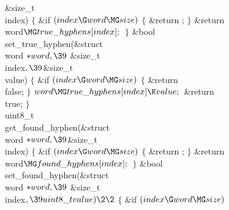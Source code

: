 \&{size\_t} \\{index})\2\2\6
${}\{{}$\1\6
\&{if} ${}(\\{index}\G\\{word}\MG\\{size}){}$\5
${}\{{}$\1\6
\&{return} ;\6
\4${}\}{}$\2\6
\&{return} \\{word}${}\MG\\{true\_hyphens}[\\{index}];{}$\6
\4${}\}{}$\2\7
\1\1\&{bool} \\{set\_true\_hyphen}(\&{struct} \\{word} ${}{*}\\{word},\39{}$%
\&{size\_t} \\{index}${},\39{}$\&{size\_t} \\{value})\2\2\6
${}\{{}$\1\6
\&{if} ${}(\\{index}\G\\{word}\MG\\{size}){}$\5
${}\{{}$\1\6
\&{return} \\{false};\6
\4${}\}{}$\2\6
${}\\{word}\MG\\{true\_hyphens}[\\{index}]\K\\{value};{}$\6
\&{return} \\{true};\6
\4${}\}{}$\2\7
\1\1\\{uint8\_t}\\{get\_found\_hyphen}(\&{struct} \\{word} ${}{*}\\{word},%
\39{}$\&{size\_t} \\{index})\2\2\6
${}\{{}$\1\6
\&{if} ${}(\\{index}\G\\{word}\MG\\{size}){}$\5
${}\{{}$\1\6
\&{return} ;\6
\4${}\}{}$\2\6
\&{return} \\{word}${}\MG\\{found\_hyphens}[\\{index}];{}$\6
\4${}\}{}$\2\7
\1\1\&{bool} \\{set\_found\_hyphen}(\&{struct} \\{word} ${}{*}\\{word},\39{}$%
\&{size\_t} \\{index}${},\39\\{uint8\_t}\\{value})\2\2{}$\6
${}\{{}$\1\6
\&{if} ${}(\\{index}\G\\{word}\MG\\{size}){}$\5

